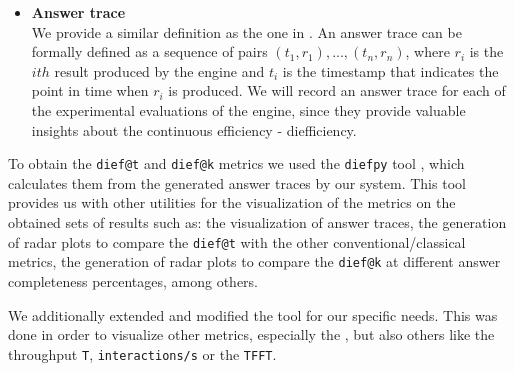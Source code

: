\begin{itemize}
    \item \textbf{Answer trace\\}
    We provide a similar definition as the one in \cite{exps-diefficiency}. An answer trace can be formally defined as a sequence of pairs $(t_1,r_1),...,(t_n,r_n)$, where $r_i$ is the $ith$ result produced by the engine and $t_i$ is the timestamp that indicates the point in time when $r_i$ is produced. We will record an answer trace for each of the experimental evaluations of the engine, since they provide valuable insights about the continuous efficiency - diefficiency.

\end{itemize}

To obtain the \texttt{dief@t} and \texttt{dief@k} metrics we used the \texttt{diefpy} tool \cite{exps-diefpy-tool}, which calculates them from the generated answer traces by our system. This tool provides us with other utilities for the visualization of the metrics on the obtained sets of results such as: the visualization of answer traces, the generation of radar plots to compare the \texttt{dief@t} with the other conventional/classical metrics, the generation of radar plots to compare the \texttt{dief@k} at different answer completeness percentages, among others.

We additionally extended and modified the tool for our specific needs. This was done in order to visualize other metrics, especially the \MRT, but also others like the throughput \texttt{T}, \texttt{interactions/s} or the \texttt{TFFT}.